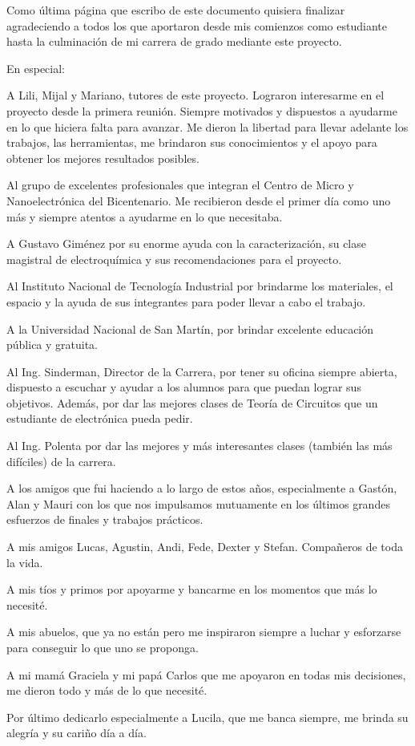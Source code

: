 
Como última página que escribo de este documento quisiera finalizar agradeciendo a todos los que aportaron desde mis comienzos como estudiante hasta la culminación de mi carrera de grado mediante este proyecto.

En especial:

A Lili, Mijal y Mariano, tutores de este proyecto. Lograron interesarme en el proyecto desde la primera reunión. Siempre motivados y dispuestos a ayudarme en lo que hiciera falta para avanzar. Me dieron la libertad para llevar adelante los trabajos, las herramientas, me brindaron sus conocimientos y el apoyo para obtener los mejores resultados posibles.

Al grupo de excelentes profesionales que integran el Centro de Micro y Nanoelectrónica del Bicentenario. Me recibieron desde el primer día como uno más y siempre atentos a ayudarme en lo que necesitaba.

A Gustavo Giménez por su enorme ayuda con la caracterización, su clase magistral de electroquímica y sus recomendaciones para el proyecto.

Al Instituto Nacional de Tecnología Industrial por brindarme los materiales, el espacio y la ayuda de sus integrantes para poder llevar a cabo el trabajo.

A la Universidad Nacional de San Martín, por brindar excelente educación pública y gratuita.

Al Ing. Sinderman, Director de la Carrera, por tener su oficina siempre abierta, dispuesto a escuchar y ayudar a los alumnos para que puedan lograr sus objetivos. Además, por dar las mejores clases de Teoría de Circuitos que un estudiante de electrónica pueda pedir.

Al Ing. Polenta por dar las mejores y más interesantes clases (también las más difíciles) de la carrera.

A los amigos que fui haciendo a lo largo de estos años, especialmente a Gastón, Alan y Mauri con los que nos impulsamos mutuamente en los últimos grandes esfuerzos de finales y trabajos prácticos.

A mis amigos Lucas, Agustin, Andi, Fede, Dexter y Stefan. Compañeros de toda la vida.

A mis tíos y primos por apoyarme y bancarme en los momentos que más lo necesité.

A mis abuelos, que ya no están pero me inspiraron siempre a luchar y esforzarse para conseguir lo que uno se proponga.

A mi mamá Graciela y mi papá Carlos que me apoyaron en todas mis decisiones, me dieron todo y más de lo que necesité. 

Por último dedicarlo especialmente a Lucila, que me banca siempre, me brinda su alegría y su cariño día a día.